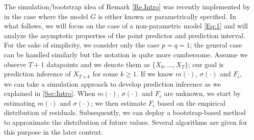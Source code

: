 \documentclass[a4paper]{article}
\begin{document}
The simulation/bootstrap idea of Remark \ref{Re.Intro} was recently implemented 
by  \cite{wu2023bootstrap} in the case where the model $G$ is either known 
or parametrically specified. In what follows, we will focus on the case of
a   non-parametric model \cref{Eq:1} and will  analyze the asymptotic properties of the point predictor and prediction interval.  For the sake of simplicity, we consider only the case $p=q=1$; the general case  can be handled similarly but the notation is quite more cumbersome. Assume we observe $T+1$ datapoints and we denote them as $\{X_{0},\ldots,X_{T}\}$; our goal is prediction inference of $X_{T+k}$ for some $k\geq1$. If we know $m(\cdot)$, $\sigma(\cdot)$ and $F_{\epsilon}$, we can take a simulation approach to develop prediction inference as we explained in \cref{Sec:Intro}. %
When $m(\cdot)$, $\sigma(\cdot)$ and $F_{\epsilon}$ are
unknown, we start by estimating $m(\cdot)$ and $\sigma(\cdot)$;
we then estimate $F_{\epsilon}$ based on the empirical distribution of 
residuals. Subsequently, we can deploy a bootstrap-based method to approximate the distribution of future values. Several algorithms are given for this purpose in the later context.  
\end{document}
